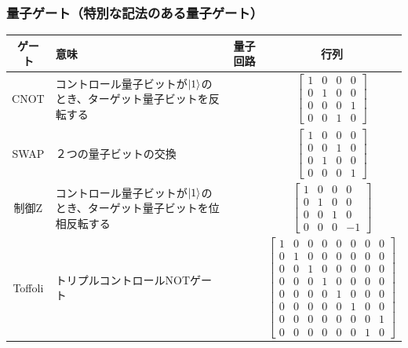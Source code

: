 \documentclass[9pt]{beamer}
\begin{document}
\begin{frame}
  \frametitle{量子ゲート（特別な記法のある量子ゲート）}
  \begin{table}[]
    \centering
    \scriptsize
    \begin{tabular}{|c|>{\arraybackslash}p{12em}|c|c|} \hline
      ゲート & 意味 & 量子回路 & 行列 \\ \hline
      CNOT & コントロール量子ビットが$\ket{1}$のとき、ターゲット量子ビットを反転する & \hspace{7em} \rule{0pt}{1em} & $\begin{bmatrix}1 & 0 & 0 & 0 \\ 0 & 1 & 0 & 0 \\ 0 & 0 & 0 & 1 \\ 0 & 0 & 1 & 0\end{bmatrix}$ \\ \hline
      SWAP & ２つの量子ビットの交換 & \hspace{7em} \rule{0pt}{1em} & $\begin{bmatrix}1 & 0 & 0 & 0 \\ 0 & 0 & 1 & 0 \\ 0 & 1 & 0 & 0 \\ 0 & 0 & 0 & 1\end{bmatrix}$ \\ \hline
      制御Z & コントロール量子ビットが$\ket{1}$のとき、ターゲット量子ビットを位相反転する & \hspace{7em} \rule{0pt}{1em} & $\begin{bmatrix}1 & 0 & 0 & 0 \\ 0 & 1 & 0 & 0 \\ 0 & 0 & 1 & 0 \\ 0 & 0 & 0 & -1\end{bmatrix}$ \\ \hline
      Toffoli & トリプルコントロールNOTゲート & \hspace{7em} \rule{0pt}{1em} & $\begin{bmatrix}1 & 0 & 0 & 0 & 0 & 0 & 0 & 0 \\ 0 & 1 & 0 & 0 & 0 & 0 & 0 & 0 \\ 0 & 0 & 1 & 0 & 0 & 0 & 0 & 0 \\ 0 & 0 & 0 & 1 & 0 & 0 & 0 & 0 \\ 0 & 0 & 0 & 0 & 1 & 0 & 0 & 0 \\ 0 & 0 & 0 & 0 & 0 & 1 & 0 & 0 \\ 0 & 0 & 0 & 0 & 0 & 0 & 0 & 1 \\ 0 & 0 & 0 & 0 & 0 & 0 & 1 & 0\end{bmatrix}$ \\ \hline
    \end{tabular}
  \end{table}
\end{frame}
\end{document}
